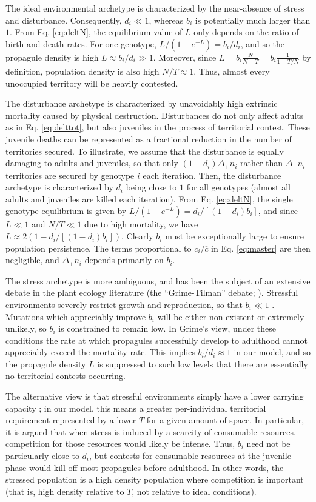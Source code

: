 \documentclass[11pt]{article}
\begin{document}
The ideal environmental archetype is characterized by the near-absence of stress and disturbance. Consequently, $d_i\ll 1$, whereas $b_i$ is potentially much larger than $1$. From Eq. \eqref{eq:deltN}, the equilibrium value of $L$ only depends on the ratio of birth and death rates. For one genotype, $L/(1-e^{-L})=b_i/d_i$, and so the propagule density is high $L\approx b_i/d_i\gg 1$. Moreover, since $L=b_i\frac{N}{N-T}=b_i\frac{1}{1-T/N}$ by definition, population density is also high $N/T\approx 1$. Thus, almost every unoccupied territory will be heavily contested. 

The disturbance archetype is characterized by unavoidably high extrinsic mortality caused by physical destruction. Disturbances do not only affect adults as in Eq. \eqref{eq:delttot}, but also juveniles in the process of territorial contest. These juvenile deaths can be represented as a fractional reduction in the number of territories secured. To illustrate, we assume that the disturbance is equally damaging to adults and juveniles, so that only $(1-d_i)\Delta_+ n_i$ rather than $\Delta_+ n_i$ territories are secured by genotype $i$ each iteration. Then, the disturbance archetype is characterized by $d_i$ being close to $1$ for all genotypes (almost all adults and juveniles are killed each iteration). From Eq. \eqref{eq:deltN}, the single genotype equilibrium is given by $L/(1-e^{-L})=d_i/[(1-d_i)b_i]$, and since $L\ll 1$ and $N/T\ll 1$ due to high mortality, we have $L\approx 2(1-d_i/[(1-d_i)b_i])$. Clearly $b_i$ must be exceptionally large to ensure population persistence. The terms proportional to $c_i/\overline{c}$ in Eq. \eqref{eq:master} are then negligible, and $\Delta_+ n_i$ depends primarily on $b_i$. 

The stress archetype is more ambiguous, and has been the subject of an extensive debate in the plant ecology literature (the ``Grime-Tilman'' debate; \citealt{aerts_1999}). Stressful environments severely restrict growth and reproduction, so that $b_i\ll 1$ \cite{grime_1974,grime_1977}. Mutations which appreciably improve $b_i$ will be either non-existent or extremely unlikely, so $b_i$ is constrained to remain low. In Grime's view, under these conditions the rate at which propagules successfully develop to adulthood cannot appreciably exceed the mortality rate. This implies $b_i/d_i\approx 1$ in our model, and so the propagule density $L$ is suppressed to such low levels that there are essentially no territorial contests occurring. 

The alternative view is that stressful environments simply have a lower carrying capacity \citep{taylor_1990}; in our model, this means a greater per-individual territorial requirement represented by a lower $T$ for a given amount of space. In particular, it is argued that when stress is induced by a scarcity of consumable resources, competition for those resources would likely be intense. Thus, $b_i$ need not be particularly close to $d_i$, but contests for consumable resources at the juvenile phase would kill off most propagules before adulthood. In other words, the stressed population is a high density population where competition is important \citep{taylor_1990} (that is, high density relative to $T$, not relative to ideal conditions). 
\end{document}
